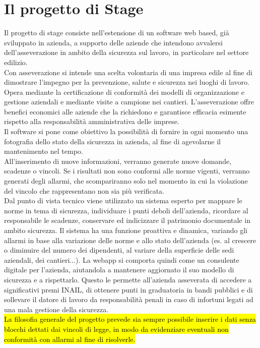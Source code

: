 
\cleardoublepage
\section{Il progetto di Stage}
Il progetto di stage consiste nell'estensione di un software web based, già sviluppato in azienda, a supporto delle aziende che intendono avvalersi dell’asseverazione in ambito della sicurezza sul lavoro, in particolare nel settore edilizio. \\
Con asseverazione si intende una scelta volontaria di una impresa edile al fine di dimostrare l'impegno per la prevenzione, salute e sicurezza nei luoghi di lavoro. Opera mediante la certificazione di conformità dei modelli di organizzazione e gestione aziendali e mediante visite a campione nei cantieri. L'asseverazione offre benefici economici alle aziende che la richiedono e garantisce efficacia esimente rispetto alla responsabilità amministrativa delle imprese.\\
Il software si pone come obiettivo la possibilità di fornire in ogni momento una fotografia dello stato della sicurezza in azienda, al fine di agevolarne il mantenimento nel tempo.\\
All'inserimento di nuove informazioni, verranno generate nuove domande, scadenze o vincoli. Se i risultati non sono conformi alle norme vigenti, verranno generati degli allarmi, che scompariranno solo nel momento in cui la violazione del vincolo che rappresentano non sia più verificata. \\
Dal punto di vista tecnico viene utilizzato un sistema esperto per mappare le norme in tema di sicurezza, individuare i punti deboli dell’azienda, ricordare al responsabile le scadenze, conservare ed indicizzare il patrimonio documentale in ambito sicurezza.
Il sistema ha una funzione proattiva e dinamica, variando gli allarmi in base alla variazione delle norme e allo stato dell’azienda (es. al crescere o diminuire del numero dei dipendenti, al variare della superficie delle sedi aziendali, dei cantieri...). La webapp si comporta quindi come un consulente digitale per l’azienda, aiutandola a mantenere aggiornato il suo modello di sicurezza e a rispettarlo.
Questo le permette all’azienda asseverata di accedere a significativi premi INAIL, di ottenere punti in graduatoria in bandi pubblici e di sollevare il datore di lavoro da responsabilità penali in caso di infortuni legati ad una mala gestione della sicurezza.\\
\hl{
La filosofia generale del progetto prevede sia  sempre possibile inserire i dati senza blocchi dettati dai vincoli di legge, in modo da evidenziare eventuali non conformità con allarmi al fine di risolverle.
}
